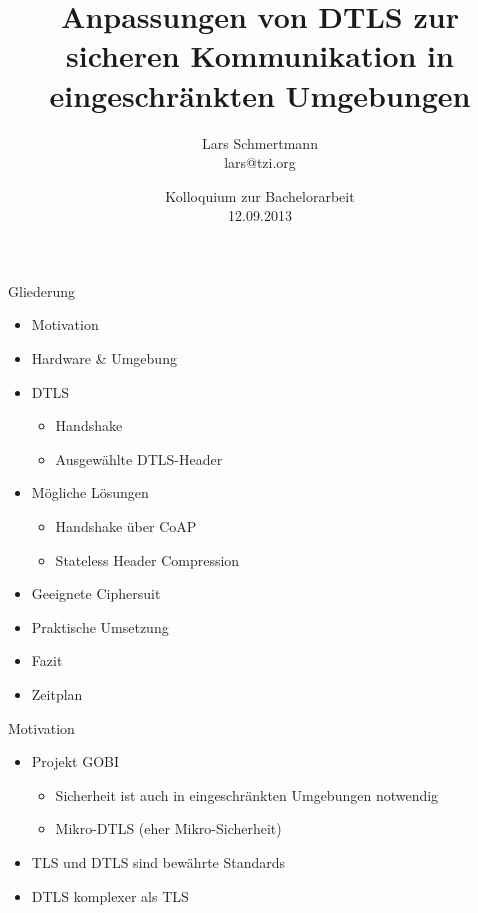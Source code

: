 \documentclass{beamer}
\title[Anpassungen von DTLS]%
{%
  Anpassungen von DTLS zur sicheren Kommunikation in eingeschränkten Umgebungen
}
\author[Lars Schmertmann]%
{
{Lars Schmertmann}\\
\vspace{.2cm}
{\scriptsize lars@tzi.org}
}
\institute{TZI, Universit\"{a}t Bremen, Deutschland}
\date[09.2013]%
{{Kolloquium zur Bachelorarbeit\\
12.09.2013}}%
\begin{document}

\begin{frame}
  \titlepage
\end{frame}

\begin{frame}{Gliederung}
  \begin{itemize}
    \item Motivation
    \item Hardware \& Umgebung
    \item DTLS
      \begin{itemize}
        \item Handshake
        \item Ausgewählte DTLS-Header
      \end{itemize}
    \item Mögliche Lösungen
    \begin{itemize}
      \item Handshake über CoAP
      \item Stateless Header Compression
    \end{itemize}
    \item Geeignete Ciphersuit
    \item Praktische Umsetzung
    \item Fazit
    \item Zeitplan
  \end{itemize}
\end{frame}

\begin{frame}{Motivation}
  \begin{itemize}
    \item Projekt GOBI
    \begin{itemize}
      \item Sicherheit ist auch in eingeschränkten \newline Umgebungen notwendig
      \item Mikro-DTLS (eher Mikro-Sicherheit)
    \end{itemize}
    \item TLS und DTLS sind bewährte Standards
    \item DTLS komplexer als TLS
  \end{itemize}
\end{frame}
\end{document}
